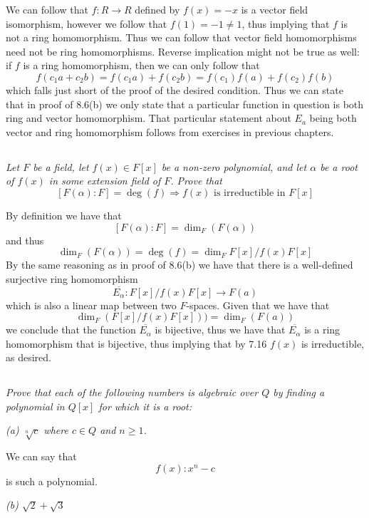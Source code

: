 \documentclass[11pt,oneside,titlepage]{book}
\DeclareMathOperator \ra {\Rightarrow}
\begin{document}
We can follow that $f: R \to R$ defined by $f(x) = -x$ is a vector
field isomorphism, however we follow that $f(1) = -1 \neq 1$, thus
implying that $f$ is not a ring homomorphism. Thus we can follow that
vector field homomorphisms need not be ring homomorphisms.  Reverse
implication might not be true as well: if $f$ is a ring homomorphism,
then we can only follow that
$$f(c_1a + c_2 b) = f(c_1a) + f(c_2 b) = f(c_1) f(a) + f(c_2) f(b)$$
which falls just short of the proof of the desired condition. Thus we
can state that in proof of 8.6(b) we only state that a particular
function in question is both ring and vector homomorphism. That
particular statement about $E_a$ being both vector and ring homomorphism
follows from exercises in previous chapters. 

\subsection{}

\textit{Let $F$ be a field, let $f(x) \in F[x]$ be a non-zero
  polynomial, and let $\alpha$ be a root of $f(x)$ in some extension
  field of $F$. Prove that
  $$[F(\alpha):F] = \deg(f) \ra f(x) \text{ is irreductible in } F[x]$$
}

By definition we have that
$$[F(\alpha):F] = \dim_F(F(\alpha))$$
and thus
$$\dim_F(F(\alpha)) = \deg(f) = \dim_F F[x]/f(x)F[x]$$
By the same reasoning as in proof of 8.6(b) we have that there is a
well-defined surjective ring homomorphism
$$\overline{E_\alpha}: F[x]/f(x)F[x] \to F(a)$$
which is also a linear map between two $F$-spaces. Given that we have
that
$$\dim_F(F[x]/f(x)F[x])) = \dim_F(F(a))$$
we conclude that the function $\overline{E_\alpha}$ is bijective,
thus we have that $\overline{E_\alpha}$ is a ring homomorphism
that is bijective, thus implying that by 7.16 $f(x)$ is
irreductible, as desired.

\subsection{}

\textit{Prove that each of the following numbers is algebraic over $Q$
  by finding a polynomial in $Q[x]$ for which it is a root:}

\textit{(a) $\sqrt[n]{c}$ where $c \in Q$ and $n \geq 1$.}

We can say that
$$f(x): x^n - c$$
is such a polynomial.

\textit{(b) $\sqrt{2} + \sqrt{3}$}
\end{document}
